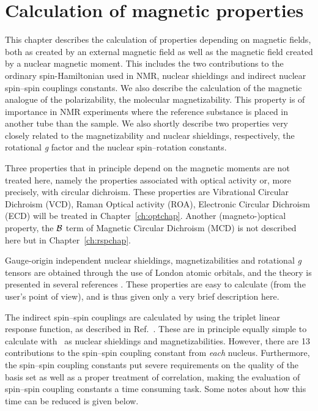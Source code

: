 \chapter{Calculation of magnetic properties}\label{ch:magnetic}

This chapter describes the calculation of properties depending on
magnetic fields, both as created by an external magnetic field as well
as the magnetic field created by a nuclear magnetic moment.
This includes the two
contributions to the ordinary spin-Hamiltonian used in NMR, nuclear
shieldings and indirect nuclear spin--spin
couplings constants. We
also describe the calculation of the magnetic analogue of the
polarizability, the molecular
magnetizability. This property
is of importance in NMR experiments where the reference substance is placed
in another tube than the sample. We also shortly
describe two properties very closely related to the magnetizability
and nuclear shieldings, respectively, the rotational {\em g} factor and the
nuclear spin--rotation constants.

Three properties that in principle depend on the %
magnetic moments are
not treated here, namely the properties associated with optical
activity or, more precisely, with circular dichroism. These
properties are Vibrational Circular Dichroism
(VCD), Raman
Optical activity (ROA),
Electronic Circular Dichroism (ECD) will be treated in Chapter~\ref{ch:optchap}.
Another (magneto-)optical property, the ${\cal{B}}$ term of
Magnetic Circular Dichroism (MCD) is not described here but in
Chapter~\ref{ch:rspchap}.

Gauge-origin independent nuclear shieldings,
magnetizabilities
and rotational {\em g} tensors are
obtained through the use of London atomic orbitals, and the theory is
presented in several references
\cite{kwjfhppjacs112,krthrkpjklbhjajjcp100,krthklbpjhjajjcp99,krthklbpjjocp195}.
These properties are easy to calculate (from the user's point of
view), and is thus given only a very brief description here.

The indirect spin--spin couplings are calculated by using the triplet linear
response function, as described in
Ref.~\cite{ovhapjhjajsbpthjcp96}.
These are in principle equally simple to calculate with \siraba\ as
nuclear shieldings and magnetizabilities. However, there are 13
contributions to the spin--spin coupling constant from {\em each}
nucleus. Furthermore, the spin--spin coupling constants put severe
requirements on the quality of the basis set as well as a proper
treatment of correlation, making the evaluation of spin--spin coupling
constants a time consuming task. Some notes about how this time
can be reduced is given below.

